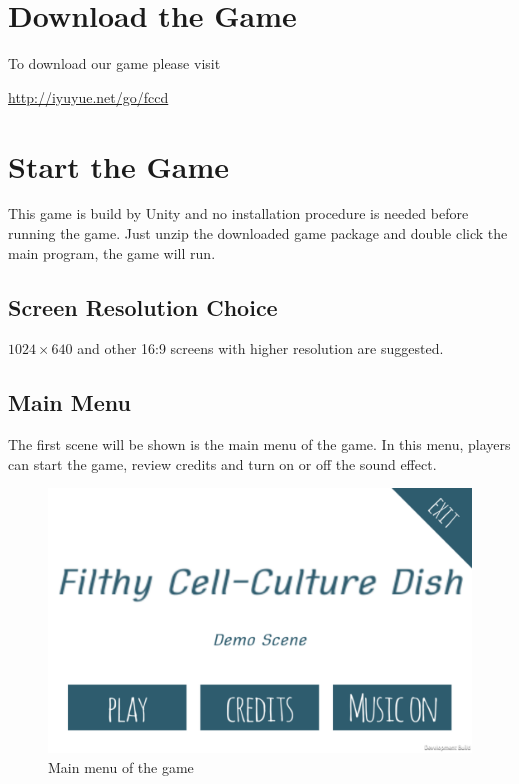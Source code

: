 \documentclass[12pt,a4paper]{scrartcl}
\begin{document}
\section{Download the Game}

To download our game please visit 
\begin{center}
\url{http://iyuyue.net/go/fccd}
\end{center}

\section{Start the Game}
This game is build by Unity and no installation procedure is needed before running the game. Just unzip the downloaded game package and double click the main program, the game will run.

\subsection{Screen Resolution Choice}

$1024\times640$ and other 16:9 screens with higher resolution are suggested.

\subsection{Main Menu}
The first scene will be shown is the main menu of the game. In this menu, players can start the game, review credits and turn on or off the sound effect.
\begin{figure}[h] 
	\centering
	\includegraphics[scale=0.2]{start1}
	\caption{Main menu of the game}
\end{figure}
\end{document}
